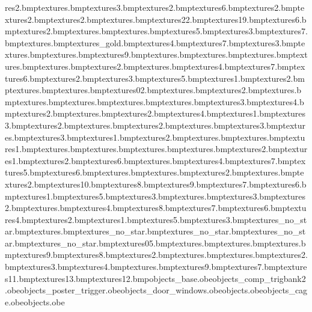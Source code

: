 res\carpetredworn2.bmp textures\industfloor.bmp textures\greenwall3.bmp textures\woodpanelswall2.bmp textures\industwalls6.bmp textures\signinfo2.bmp textures\industwalls2.bmp textures\industmarb2.bmp textures\matclean.bmp textures\painting22.bmp textures\painting19.bmp textures\doorarch6.bmp textures\doorarch2.bmp textures\entryblue.bmp textures\matmoney.bmp textures\doorarch5.bmp textures\doorarch3.bmp textures\doorarch7.bmp textures\toilettank.bmp textures\floor_gold.bmp textures\wall4.bmp textures\wall7.bmp textures\wall3.bmp textures\lobbywallpinkbord.bmp textures\lobbywallpinkbocorn.bmp textures\wall9.bmp textures\lobbywallpinkbotop.bmp textures\museummat.bmp textures\wallheat.bmp textures\panels.bmp textures\window.bmp textures\window2.bmp textures\pillardoor.bmp textures\lobbydesk4.bmp textures\lobbydesk7.bmp textures\lobbydesk6.bmp textures\lobbydesk2.bmp textures\lobbydesk3.bmp textures\lobbydesk5.bmp textures\pillar1.bmp textures\pillar2.bmp textures\tv.bmp textures\tvback.bmp textures\handdryer02.bmp textures\sink.bmp textures\toilet2.bmp textures\toilet.bmp textures\toiletseat.bmp textures\chain.bmp textures\lobbywallsbord.bmp textures\coin.bmp textures\seccam3.bmp textures\seccam4.bmp textures\seccam2.bmp textures\seccam.bmp textures\road2.bmp textures\vpaint4.bmp textures\vpaint1.bmp textures\vpaint3.bmp textures\vpaint2.bmp textures\vpaintcloth.bmp textures\vpaintbed2.bmp textures\vpaintbed.bmp textures\vpaintbed3.bmp textures\vpaintwind.bmp textures\painting3.bmp textures\painting1.bmp textures\painting2.bmp textures\liftdoors.bmp textures\shipsteps.bmp textures\locker1.bmp textures\paintinglightning.bmp textures\wallsewer.bmp textures\pipe.bmp textures\crate.bmp textures\paintinglightning2.bmp textures\grill1.bmp textures\grill2.bmp textures\companel6.bmp textures\desktops.bmp textures\signinfo4.bmp textures\signinfo7.bmp textures\signinfo5.bmp textures\signinfo6.bmp textures\paper.bmp textures\plaqueinfo.bmp textures\plaquehotdog2.bmp textures\signinfo.bmp textures\desktops2.bmp textures\signinfo10.bmp textures\signinfo8.bmp textures\signinfo9.bmp textures\signdirection7.bmp textures\signdirection6.bmp textures\signdirection1.bmp textures\signdirection5.bmp textures\signdirection3.bmp textures\toiletshelf.bmp textures\toiletrolls3.bmp textures\toiletrolls2.bmp textures\toiletrolls.bmp textures\signdirection4.bmp textures\target8.bmp textures\target7.bmp textures\target6.bmp textures\target4.bmp textures\target2.bmp textures\target1.bmp textures\target5.bmp textures\target3.bmp textures_no_star.bmp textures\paintingedge.bmp textures_no_star.bmp textures_no_star.bmp textures_no_star.bmp textures_no_star.bmp textures\cactus05.bmp textures\ceiling.bmp textures\bone.bmp textures\boltscrew.bmp textures\companel9.bmp textures\signdirection8.bmp textures\noteboard2.bmp textures\noteboard.bmp textures\banner.bmp textures\banner2.bmp textures\banner3.bmp textures\banner4.bmp textures\gramshine.bmp textures\painting9.bmp textures\painting7.bmp textures\painting11.bmp textures\painting13.bmp textures\painting12.bmp objects\bulb_base.obe objects\trash_comp_trigbank2.obe objects\4_poster_trigger.obe objects\front_door_windows.obe objects\fire.obe objects\reset_cage.obe objects\truck.obe 